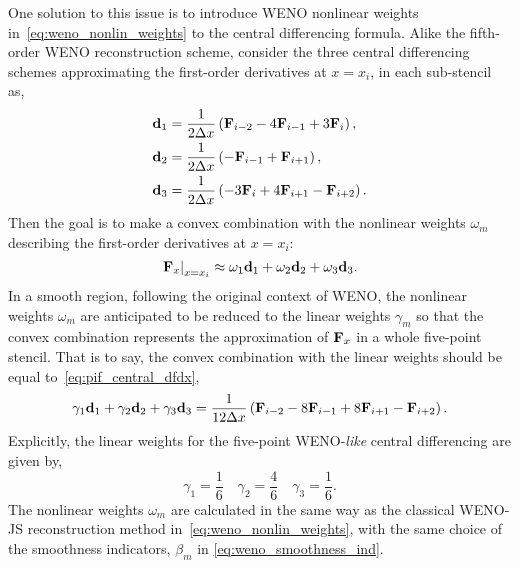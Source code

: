 One solution to this issue is to introduce WENO nonlinear weights in~\cref{eq:weno_nonlin_weights}
to the central differencing formula.
Alike the fifth-order WENO reconstruction scheme,
consider the three central differencing schemes approximating
the first-order derivatives at \( x = x_{i} \),
in each sub-stencil as,
\begin{equation}\label{eq:pif_wenodiff_subs}
    \begin{split}
        \mathbf{d}_{1} & = \frac{1}{2 \Delta x} \left( \mathbf{F}_{i - 2} - 4 \mathbf{F}_{i - 1} + 3 \mathbf{F}_{i} \right), \\
        \mathbf{d}_{2} & = \frac{1}{2 \Delta x} \left( - \mathbf{F}_{i - 1} + \mathbf{F}_{i + 1} \right), \\
        \mathbf{d}_{3} & = \frac{1}{2 \Delta x} \left( - 3 \mathbf{F}_{i} + 4 \mathbf{F}_{i + 1} - \mathbf{F}_{i + 2} \right).
    \end{split}
\end{equation}
Then the goal is to make a convex combination with the nonlinear weights \( \omega_{m} \)
describing the first-order derivatives at \( x=x_{i} \):
\begin{equation}\label{eq:pif_wenodiff_convex}
    \left. \mathbf{F}_{x} \right|_{x = x_{i}} \approx \omega_{1} \mathbf{d}_{1} + \omega_{2} \mathbf{d}_{2} + \omega_{3} \mathbf{d}_{3}.
\end{equation}
In a smooth region, following the original context of WENO,
the nonlinear weights \( \omega_{m} \) are anticipated to be reduced
to the linear weights \( \gamma_{m} \) so that the convex combination represents
the approximation of \( \mathbf{F}_{x} \) in a whole five-point stencil.
That is to say, the convex combination with the linear weights
should be equal to~\cref{eq:pif_central_dfdx},
\begin{equation}\label{eq:pif_wenodiff_linear_convex}
    \gamma_{1} \mathbf{d}_{1} + \gamma_{2} \mathbf{d}_{2} + \gamma_{3} \mathbf{d}_{3} =
    \frac{1}{12 \Delta x} \left( \mathbf{F}_{i - 2} - 8 \mathbf{F}_{i - 1} + 8 \mathbf{F}_{i + 1} - \mathbf{F}_{i + 2} \right).
\end{equation}
Explicitly, the linear weights for the five-point WENO-\textit{like} central differencing
are given by,
\begin{equation}\label{eq:pif_wenodiff_linear_weights}
    \gamma_{1} = \frac{1}{6} \quad \gamma_{2} = \frac{4}{6} \quad \gamma_{3} = \frac{1}{6}.
\end{equation}
The nonlinear weights \( \omega_{m} \) are calculated in the same way
as the classical WENO-JS reconstruction method in~\cref{eq:weno_nonlin_weights},
with the same choice of the smoothness indicators, \( \beta_{m} \) in \cref{eq:weno_smoothness_ind}.

